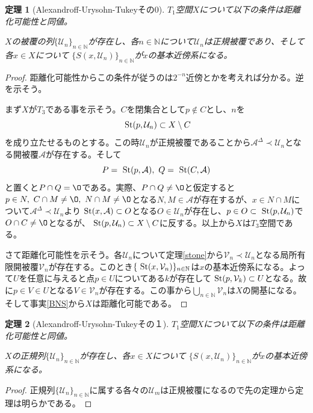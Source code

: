 \documentclass[leqno]{jsarticle}
\newtheorem{thm}{定理}
\newcommand{\nn}{\mathbb{N}}
\newcommand{\s}{\text{  {\rm St}} }
\newcommand{\uu}{\mathcal{U}}
\newcommand{\vv}{\mathcal{V}}
\newcommand{\A}{\mathcal{A}}
\newcommand{\dd}{\Delta}
\newcommand{\pr}{\prec}
\begin{document}
\begin{thm}[Alexandroff-Urysohn-Tukeyその0]
$T_1$空間$X$について以下の条件は距離化可能性と同値。\par
$X$の被覆の列$\{\mathcal{U}_n\}_{n\in \nn}$が存在し、各$n\in \nn$について$\mathcal{U}_n$は正規被覆であり、そして各$x\in X$について
$\{S(x,\mathcal{U}_n)\}_{n\in \nn}$が$x$の基本近傍系になる。
\end{thm}
\begin{proof}
距離化可能性からこの条件が従うのは$2^{-n}$近傍とかを考えれば分かる。逆を示そう。\par
まず$X$が$T_3$である事を示そう。$C$を閉集合として$p\not\in C$とし、$n$を
\[
\s(p,\uu_n)\subset X\setminus C
\]
を成り立たせるものとする。この時$\uu_n$が正規被覆であることから$\A^{\dd}\pr\uu_n$となる開被覆$\A$が存在する。そして
\[
P=\s(p,\A),\ Q=\s(C,\A)
\]
と置くと$P\cap Q=\O$である。実際、$P\cap Q\neq \O$と仮定すると$p\in N,\ C\cap M\neq \O,\ N\cap M\neq\O$となる$N,M\in \A$が存在するが、$x\in N\cap M$について$\A^{\dd}\pr \uu_n$より$\s(x,\A)\subset O$となる$O\in\uu_n$が存在し、$p\in O\subset \s(p,\uu_n)$で$O\cap C\neq\O$となるが、$\s(p,\uu_n)\subset X\setminus C$に反する。以上から$X$は$T_3$空間である。\par
さて距離化可能性を示そう。各$\uu_n$について定理\ref{stone}から$\vv_n\pr\uu_n$となる局所有限開被覆$\vv_n$が存在する。このとき$\{\s(x,\vv_n)\}_{n\in \nn}$は$x$の基本近傍系になる。よって$U$を任意に与えると点$p\in U$についてある$k$が存在して$\s(p,\vv_k)\subset U$となる。故に$p\in V\in U$となる$V\in \vv_n$が存在する。この事から$\bigcup_{n\in \nn}\vv_n$は$X$の開基になる。そして事実\ref{BNS}から$X$は距離化可能である。
\end{proof}



\begin{thm}[Alexandroff-Urysohn-Tukeyその１]
$T_1$空間$X$について以下の条件は距離化可能性と同値。\par
$X$の正規列$\{\mathcal{U}_n\}_{n\in \nn}$が存在し、各$x\in X$について
$\{S(x,\mathcal{U}_n)\}_{n\in \nn}$が$x$の基本近傍系になる。
\end{thm}
\begin{proof}
正規列$\{\uu_n\}_{n\in\nn}$に属する各々の$\uu_m$は正規被覆になるので先の定理から定理は明らかである。
\end{proof}
\end{document}
